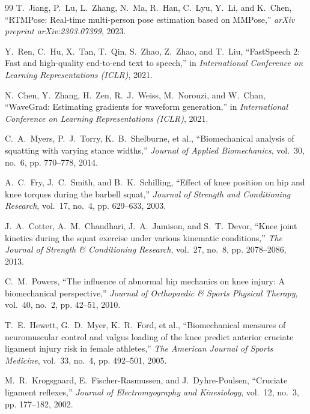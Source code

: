 \documentclass[12pt]{report}
\begin{document}
\begin{thebibliography}{99}
T.~Jiang, P.~Lu, L.~Zhang, N.~Ma, R.~Han, C.~Lyu, Y.~Li, and K.~Chen,
\newblock ``RTMPose: Real-time multi-person pose estimation based on MMPose,''
\newblock \emph{arXiv preprint arXiv:2303.07399}, 2023.

Y.~Ren, C.~Hu, X.~Tan, T.~Qin, S.~Zhao, Z.~Zhao, and T.~Liu,
\newblock ``FastSpeech 2: Fast and high-quality end-to-end text to speech,''
\newblock in \emph{International Conference on Learning Representations (ICLR)}, 2021.

N.~Chen, Y.~Zhang, H.~Zen, R.~J.~Weiss, M.~Norouzi, and W.~Chan,
\newblock ``WaveGrad: Estimating gradients for waveform generation,''
\newblock in \emph{International Conference on Learning Representations (ICLR)}, 2021.

C.~A.~Myers, P.~J.~Torry, K.~B.~Shelburne, et al.,
\newblock ``Biomechanical analysis of squatting with varying stance widths,''
\newblock \emph{Journal of Applied Biomechanics}, vol.~30, no.~6, pp. 770--778, 2014.

A.~C.~Fry, J.~C.~Smith, and B.~K.~Schilling,
\newblock ``Effect of knee position on hip and knee torques during the barbell squat,''
\newblock \emph{Journal of Strength and Conditioning Research}, vol.~17, no.~4, pp. 629--633, 2003.

J.~A.~Cotter, A.~M.~Chaudhari, J.~A.~Jamison, and S.~T.~Devor,
\newblock ``Knee joint kinetics during the squat exercise under various kinematic conditions,''
\newblock \emph{The Journal of Strength \& Conditioning Research}, vol.~27, no.~8, pp. 2078--2086, 2013.

C.~M.~Powers,
\newblock ``The influence of abnormal hip mechanics on knee injury: A biomechanical perspective,''
\newblock \emph{Journal of Orthopaedic \& Sports Physical Therapy}, vol.~40, no.~2, pp. 42--51, 2010.

T.~E.~Hewett, G.~D.~Myer, K.~R.~Ford, et al.,
\newblock ``Biomechanical measures of neuromuscular control and valgus loading of the knee predict anterior cruciate ligament injury risk in female athletes,''
\newblock \emph{The American Journal of Sports Medicine}, vol.~33, no.~4, pp. 492--501, 2005.

M.~R.~Krogsgaard, E.~Fischer-Rasmussen, and J.~Dyhre-Poulsen,
\newblock ``Cruciate ligament reflexes,''
\newblock \emph{Journal of Electromyography and Kinesiology}, vol.~12, no.~3, pp. 177--182, 2002.


\end{thebibliography}
\end{document}

